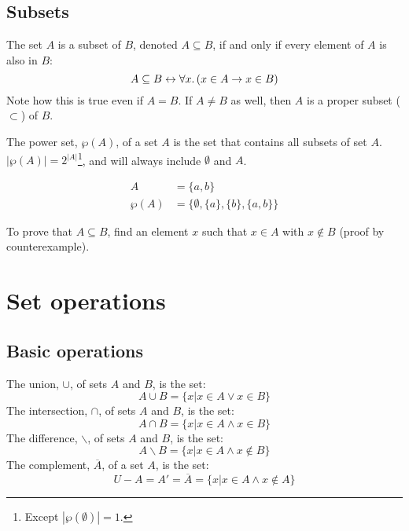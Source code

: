 \subsection{Subsets}
The set \(A\) is a subset of \(B\), denoted \(A \subseteq B\), if and only if every element of \(A\) is also in \(B\):
\begin{equation*}
    \label{eq:subset}
    A \subseteq B \leftrightarrow \forall x\ldotp (x \in A \rightarrow x \in B)
\end{equation*}
Note how this is true even if \(A = B\). If \(A \neq B\) as well, then \(A\) is a proper subset (\(\subset\)) of \(B\).

The power set, \(\wp(A)\), of a set \(A\) is the set that contains all subsets of set \(A\). \(|\wp(A)| = 2^{|A|}\)\footnote{Except \(|\wp(\emptyset)| = 1\).}, and will always include \(\emptyset\) and \(A\).
\begin{example}
    \begin{align*}
        A      & = \{a, b\}                              \\
        \wp(A) & = \{\emptyset, \{a\}, \{b\}, \{a, b\}\}
    \end{align*}
\end{example}
To prove that \(A \subseteq B\), find an element \(x\) such that \(x \in A\) with \(x \notin B\) (proof by counterexample).

\section{Set operations}
\subsection{Basic operations}
The union, \(\cup\), of sets \(A\) and \(B\), is the set:
\begin{equation*}
    A \cup B = \{x | x \in A \lor x \in B\}
\end{equation*}
The intersection, \(\cap\), of sets \(A\) and \(B\), is the set:
\begin{equation*}
    A \cap B = \{x | x \in A \land x \in B\}
\end{equation*}
The difference, \(\backslash\), of sets \(A\) and \(B\), is the set:
\begin{equation*}
    A \backslash B = \{x | x \in A \land x \notin B\}
\end{equation*}
The complement, \(\overline{A}\), of a set \(A\), is the set:
\begin{equation*}
    U - A = A' = \overline{A} = \{x | x \in A \land x \notin A\}
\end{equation*}

